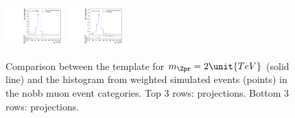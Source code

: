 \begin{figure}[htpb]
  \includegraphics[width=0.2\textwidth]{fig/analysisAppendix/templateVsReco_VBFZprToWW2000_r0_MJ_mu_HP_vbf_HDy.pdf}
  \includegraphics[width=0.2\textwidth]{fig/analysisAppendix/templateVsReco_VBFZprToWW2000_r0_MJ_mu_LP_vbf_HDy.pdf}\\
  \caption{
    Comparison between the \VBF\ZprtoWW template for $m_{\Zpr}=2\unit{TeV}$ (solid line) and the histogram from weighted simulated events (points) in the nobb muon event categories.
    Top 3 rows: \MVV projections.
    Bottom 3 rows: \MJ projections.
  }
  \label{fig:1dtemplateVsReco_VBFZprToWW2000}
\end{figure}

